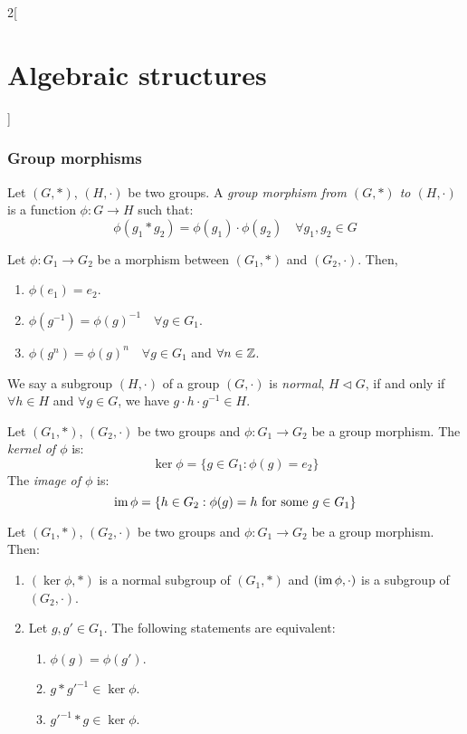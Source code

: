 \documentclass[../../../main.tex]{subfiles}
\begin{document}
\begin{multicols}{2}[\section{Algebraic structures}]
  \subsubsection{Group morphisms}
  \begin{definition}\label{AS-groupmorphism}
    Let $(G,*)$, $(H,\cdot)$ be two groups. A \textit{group morphism from $(G,*)$ to $(H,\cdot)$} is a function $\phi:G\rightarrow H$ such that: $$\phi(g_1*g_2)=\phi(g_1)\cdot\phi(g_2)\quad\forall g_1,g_2\in G$$
  \end{definition}
  \begin{lemma}
    Let $\phi:G_1\rightarrow G_2$ be a morphism between $(G_1,*)$ and $(G_2,\cdot)$. Then,
    \begin{enumerate}
      \item $\phi(e_1)=e_2$.
      \item $\phi(g^{-1})=\phi(g)^{-1}\quad\forall g\in G_1$.
      \item $\phi(g^n)=\phi(g)^n\quad\forall g\in G_1$ and $\forall n\in\mathbb{Z} $.
    \end{enumerate}
  \end{lemma}
  \begin{definition}
    We say a subgroup $(H,\cdot)$ of a group $(G,\cdot)$ is \textit{normal}, $H\lhd G$, if and only if $\forall h\in H$ and $\forall g\in G$, we have $g\cdot h\cdot g^{-1}\in H$.
  \end{definition}
  \begin{definition}
    Let $(G_1,*)$, $(G_2,\cdot)$ be two groups and $\phi:G_1\rightarrow G_2$ be a group morphism. The \textit{kernel of $\phi$} is: $$\ker\phi=\{g\in G_1:\phi(g)=e_2\}$$
    The \textit{image of $\phi$} is: $$\operatorname{im}\phi=\{h\in G_2:\phi(g)=h\text{ for some }g\in G_1\}$$
  \end{definition}
  \begin{prop}
    Let $(G_1,*)$, $(G_2,\cdot)$ be two groups and $\phi:G_1\rightarrow G_2$ be a group morphism. Then:
    \begin{enumerate}
      \item $(\ker\phi,*)$ is a normal subgroup of $(G_1,*)$ and $(\operatorname{im}\phi,\cdot)$ is a subgroup of $(G_2,\cdot)$.
      \item Let $g,g'\in G_1$. The following statements are equivalent:
            \begin{enumerate}
              \item $\phi(g)=\phi(g')$.
              \item $g*g'^{-1}\in\ker\phi$.
              \item $g'^{-1}*g\in\ker\phi$.

\end{enumerate}
\end{enumerate}
\end{prop}
\end{multicols}
\end{document}

